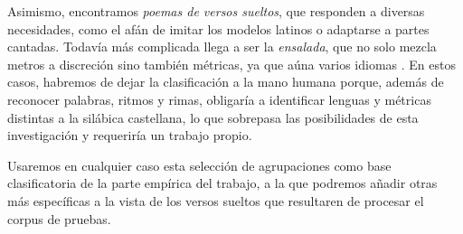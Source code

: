 Asimismo, encontramos \textit{poemas de versos sueltos}, que responden a diversas necesidades, como el afán de imitar los modelos latinos o adaptarse a partes cantadas. Todavía más complicada llega a ser la \textit{ensalada}, que no solo mezcla metros a discreción sino también métricas, ya que aúna varios idiomas \parencites[314]{diazrengifo2012}[\textit{s.v.} \textit{ensalada}]{dominguez1985}. En estos casos, habremos de dejar la clasificación a la mano humana porque, además de reconocer palabras, ritmos y rimas, obligaría a identificar lenguas y métricas distintas a la silábica castellana, lo que sobrepasa las posibilidades de esta investigación y requeriría un trabajo propio.  

 Usaremos en cualquier caso esta selección de agrupaciones como base clasificatoria de la parte empírica del trabajo, a la que podremos añadir otras más específicas a la vista de los versos sueltos que resultaren de procesar el corpus de pruebas.
